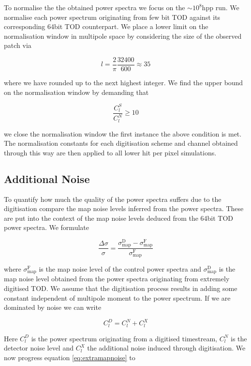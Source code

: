 \documentclass[apj]{emulateapj}
\begin{document}
To normalise the the obtained power spectra we focus on the $\sim 10^8 \mathrm{hpp}$ run. We normalise each power spectrum originating from few bit TOD against its corresponding 64bit TOD counterpart. We place a lower limit on the normalisation window in multipole space by considering the size of the observed patch via

\[ l = \frac{2}{\pi} \frac{32400}{600} \approx 35 \]

where we have rounded up to the next highest integer. We find the upper bound on the normalisation window by demanding that

\[ \frac{C_l^{S}}{C_l^{N}} \geq 10 \]

we close the normalisation window the first instance the above condition is met. The normalisation constants for each digitisation scheme and channel obtained through this way are then applied to all lower hit per pixel simulations.

\subsection{Additional Noise}
\label{subsec:additionalnoise}

To quantify how much the quality of the power spectra suffers due to the digitisation compare the map noise levels inferred from the power spectra. These are put into the context of the map noise levels deduced from the 64bit TOD power spectra. We formulate

\begin{equation} \label{eq:extramapnoise}
\frac{\Delta \sigma}{\sigma} = \frac{\sigma_{\mathrm{map}}^{\mathrm{D}}-\sigma_{\mathrm{map}}^{\mathrm{F}}}{\sigma_{\mathrm{map}}^{\mathrm{F}}}
\end{equation}

where $\sigma_{\mathrm{map}}^{\mathrm{F}}$ is the map noise level of the control power spectra and $\sigma_{\mathrm{map}}^{\mathrm{D}}$ is the map noise level obtained from the power spectra originating from extremely digitised TOD. We assume that the digitisation process results in adding some constant independent of multipole moment to the power spectrum. If we are dominated by noise we can write

\[ C_l^D = C_l^N + C_l^X \]

Here $C_l^D$ is the power spectrum originating from a digitised timestream, $C_l^N$ is the detector noise level and $C_l^X$ the additional noise induced through digitisation. We now progress equation \ref{eq:extramapnoise} to
\end{document}
